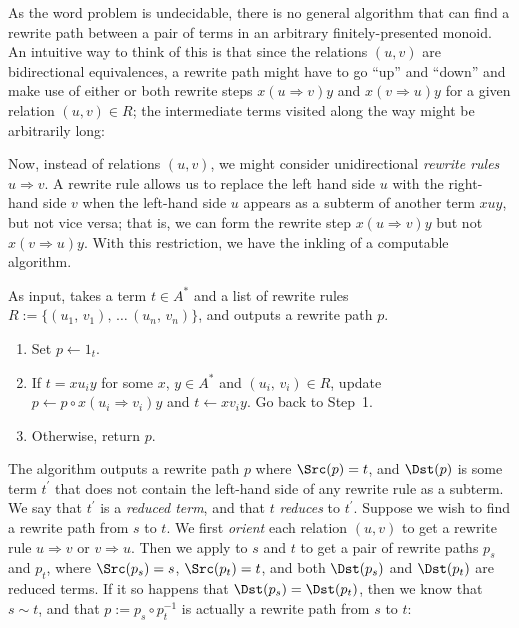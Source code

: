 \documentclass[../generics]{subfiles}
\begin{document}
As the word problem is undecidable, there is no general algorithm that can find a rewrite path between a pair of terms in an arbitrary finitely-presented monoid. An intuitive way to think of this is that since the relations $(u, v)$ are bidirectional equivalences, a rewrite path might have to go ``up'' and ``down'' and make use of either or both rewrite steps $x(u\Rightarrow v)y$ and $x(v\Rightarrow u)y$ for a given relation $(u, v)\in R$; the intermediate terms visited along the way might be arbitrarily long:
\begin{quote}
\end{quote}
Now, instead of relations $(u,v)$, we might consider unidirectional \emph{rewrite rules} $u\Rightarrow v$. A rewrite rule allows us to replace the left hand side $u$ with the right-hand side $v$ when the left-hand side $u$ appears as a subterm of another term $xuy$, but not vice versa; that is, we can form the rewrite step $x(u\Rightarrow v)y$ but not $x(v\Rightarrow u)y$. With this restriction, we have the inkling of a computable algorithm.
\begin{algorithm}\label{term reduction algo}
As input, takes a term $t\in A^*$ and a list of rewrite rules $R:=\{(u_1,\,v_1),\,\ldots\,(u_n,\,v_n)\}$, and outputs a rewrite path $p$.
\begin{enumerate}
\item Set $p\leftarrow 1_t$.
\item If $t=xu_iy$ for some $x$, $y\in A^*$ and $(u_i,\,v_i)\in R$, update $p\leftarrow p\circ x(u_i\Rightarrow v_i)y$ and $t\leftarrow xv_iy$. Go back to Step~1.
\item Otherwise, return $p$.
\end{enumerate}
\end{algorithm}
The algorithm outputs a rewrite path $p$ where $\Src(p)=t$, and $\Dst(p)$ is some term $t^\prime$ that does not contain the left-hand side of any rewrite rule as a subterm. We say that $t^\prime$ is a \emph{reduced term}, and that $t$ \emph{reduces} to $t^\prime$. Suppose we wish to find a rewrite path from $s$ to $t$. We first \emph{orient} each relation $(u, v)$ to get a rewrite rule $u\Rightarrow v$ or $v\Rightarrow u$. Then we apply  to $s$ and $t$ to get a pair of rewrite paths $p_s$ and $p_t$, where $\Src(p_s)=s$, $\Src(p_t)=t$, and both $\Dst(p_s)$ and $\Dst(p_t)$ are reduced terms. If it so happens that $\Dst(p_s)=\Dst(p_t)$, then we know that $s\sim t$, and that $p:= p_s \circ p_t^{-1}$ is actually a rewrite path from $s$ to $t$:
\end{document}
